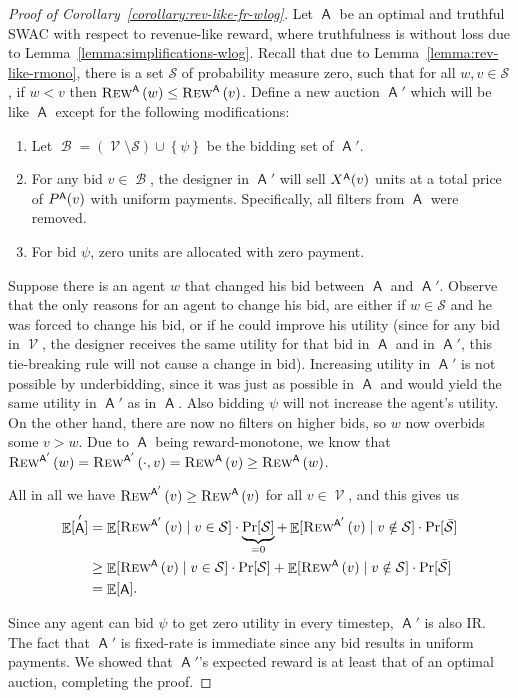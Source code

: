 \documentclass[11pt,letterpaper]{article}
\newcommand{\set}[1]{\left\{#1\right\}}
\newcommand{\brackets}[1]{\left( #1 \right)}
\newcommand{\rmono}{reward-monotone\xspace}
\newcommand{\fr}{fixed-rate\xspace}
\newcommand{\swac}{SWAC\xspace}
\DeclareMathOperator*{\E}{\bb{E}}
\newcommand{\bb}[1]{\mathbb{#1}}
\DeclareMathOperator{\A}{\auc{A}}
\DeclareMathOperator{\B}{\mathcal{B}}
\renewcommand{\S}{\mathcal{S}}
\DeclareMathOperator{\V}{\mathcal{V}}
\theoremstyle{plain}
\newcommand{\auc}[1]{\mathsf{#1}}
\begin{document}
\begin{proof}[Proof of Corollary~\ref{corollary:rev-like-fr-wlog}]
    Let $\A$ be an optimal and truthful \swac with respect to revenue-like reward, where truthfulness is without loss due to Lemma~\ref{lemma:simplifications-wlog}. Recall that due to Lemma~\ref{lemma:rev-like-rmono}, there is a set $\S$ of probability measure zero, such that for all $w,v\in\S$, if $w<v$ then $\trew[\A]{w}\leq \trew[\A]{v}$. Define a new auction $\A'$ which will be like $\A$ except for the following modifications:
    \begin{enumerate}
        \item Let $\B=\brackets{\V\setminus\S}\cup\set{\psi}$ be the bidding set of $\A'$.
        \item For any bid $v\in\B$, the designer in $\A'$ will sell $\x[\A]{v}$ units at a total price of $\p[\A]{v}$ with uniform payments. Specifically, all filters from $\A$ were removed.
        \item For bid $\psi$, zero units are allocated with zero payment.
    \end{enumerate}

    Suppose there is an agent $w$ that changed his bid between $\A$ and $\A'$. Observe that the only reasons for an agent to change his bid, are either if $w\in\S$ and he was forced to change his bid, or if he could improve his utility (since for any bid in $\V$, the designer receives the same utility for that bid in $\A$ and in $\A'$, this tie-breaking rule will not cause a change in bid). Increasing utility in $\A'$ is not possible by underbidding, since it was just as possible in $\A$ and would yield the same utility in $\A'$ as in $\A$. Also bidding $\psi$ will not increase the agent's utility. On the other hand, there are now no filters on higher bids, so $w$ now overbids some $v>w$. Due to $\A$ being \rmono, we know that $\trew[\A']{w}=\rew[\A']{\cdot}{v}=\trew[\A]{v}\geq \trew[\A]{w}$.

    All in all we have $\trew[\A']{v}\geq \trew[\A]{v}$ for all $v\in\V$, and this gives us
    \begin{align*}
        \E[\A']&=\E[\trew[\A']{v}\mid v\in\S]\cdot\underbrace{\Pr[\S]}_{=0}+\E[\trew[\A']{v}\mid v\notin\S]\cdot\Pr[\Bar{\S}]\\
        &\geq\E[\trew[\A]{v}\mid v\in\S]\cdot\Pr[\S]+\E[\trew[\A]{v}\mid v\notin\S]\cdot\Pr[\Bar{\S}]\\
        &=\E[\A].
    \end{align*}

    Since any agent can bid $\psi$ to get zero utility in every timestep, $\A'$ is also IR. The fact that $\A'$ is \fr is immediate since any bid results in uniform payments. We showed that $\A'$'s expected reward is at least that of an optimal auction, completing the proof.
\end{proof}
\end{document}
